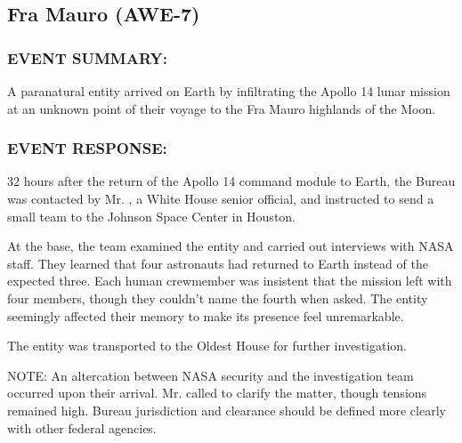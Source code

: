 \subsection*{Fra Mauro (AWE-7)}
\subsubsection*{EVENT SUMMARY:}
\par A paranatural entity arrived on Earth by infiltrating the Apollo 14
lunar mission at an unknown point of their voyage to the Fra
Mauro highlands of the Moon.
\subsubsection*{EVENT RESPONSE:}
\par 32 hours after the return of the Apollo 14 command module to
Earth, the Bureau was contacted by Mr. , a White
House senior official, and instructed to send a small team to the
Johnson Space Center in Houston.
\par At the base, the team examined the entity and carried out
interviews with NASA staff. They learned that four astronauts had
returned to Earth instead of the expected three. Each human
crewmember was insistent that the mission left with four
members, though they couldn't name the fourth when asked. The
entity seemingly affected their memory to make its presence feel
unremarkable.
\par The entity was transported to the Oldest House for further
investigation.
\par NOTE: An altercation between NASA security and the
investigation team occurred upon their arrival. Mr. 
called to clarify the matter, though tensions remained high.
Bureau jurisdiction and clearance should be defined more clearly
with other federal agencies.